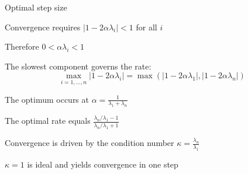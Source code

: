 \documentclass[11pt,compress,t,notes=noshow, xcolor=table]{beamer}
\begin{document}
\begin{framei}{Optimal step size}
\item Convergence requires $|1 - 2 \alpha \lambda_i| < 1$ for all $i$
\item Therefore $0 < \alpha \lambda_i < 1$
\item The slowest component governs the rate:
$$
\max_{i = 1, \dots, n} |1 - 2 \alpha \lambda_i| = \max(|1 - 2 \alpha \lambda_1|, |1 - 2 \alpha \lambda_n|)
$$
\item The optimum occurs at $\alpha = \frac{1}{\lambda_1 + \lambda_n}$
\item The optimal rate equals $\frac{\lambda_n / \lambda_1 - 1}{\lambda_n / \lambda_1 + 1}$
\item Convergence is driven by the condition number $\kappa = \frac{\lambda_n}{\lambda_1}$
\item $\kappa = 1$ is ideal and yields convergence in one step
\end{framei}


\endlecture
\end{document}
